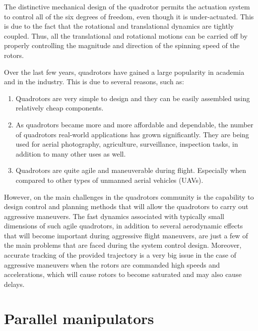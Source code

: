 \documentclass{thesisreport}
\begin{document}
The distinctive mechanical design of the quadrotor permits the actuation system to control all of the six degrees of freedom, even though it is under-actuated. This is due to the fact that the rotational and translational dynamics are tightly coupled. Thus, all the translational and rotational motions can be carried off by properly controlling the magnitude and direction of the spinning speed of the rotors.   



\pagebreak

Over the last few years, quadrotors have gained a large popularity in academia and in the industry. This is due to several reasons, such as: 

\begin{enumerate}

    \item Quadrotors are very simple to design and they can be easily assembled using relatively cheap components.  
    \item As quadrotors became more and more affordable and dependable, the number of quadrotors real-world applications has grown significantly. They are being used for aerial photography, agriculture, surveillance, inspection tasks, in addition to many other uses as well. 
    \item Quadrotors are quite agile and maneuverable during flight. Especially when compared to other types of unmanned aerial vehicles (UAVs). 
    
\end{enumerate}

However, on the main challenges in the quadrotors community is the capability to design control and planning methods that will allow the quadrotors to carry out aggressive maneuvers.  The fast dynamics associated with typically small dimensions of such agile quadrotors, in addition to several aerodynamic effects that will become important during aggressive flight maneuvers, are just a few of the main problems that are faced during the system control design. Moreover, accurate tracking of the provided trajectory is a very big issue in the case of aggressive maneuvers when the rotors are commanded high speeds and accelerations, which will cause rotors to become saturated and may also cause delays.


 \section*{Parallel manipulators}
\end{document}
